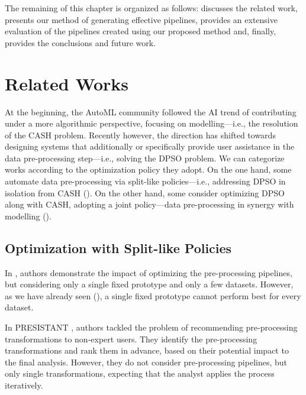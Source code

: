 The remaining of this chapter is organized as follows:
 discusses the related work,
 presents our method of generating effective pipelines,
 provides an extensive evaluation of the pipelines created using our proposed method and, finally,  provides the conclusions and future work.


\section{Related Works}
\label{effective-sec:related-work}
At the beginning, the AutoML community followed the AI trend of contributing under a more algorithmic perspective, focusing on modelling---i.e., the resolution of the CASH problem.
Recently however, the direction has shifted towards designing systems that additionally or specifically provide user assistance in the data pre-processing step---i.e., solving the DPSO problem.
We can categorize works according to the optimization policy \cite{quemy2019data} they adopt.
On the one hand, some automate data pre-processing via split-like policies---i.e., addressing DPSO in isolation from CASH ().
On the other hand, some consider optimizing DPSO along with CASH, adopting a joint policy---data pre-processing in synergy with modelling ().

\subsection{Optimization with Split-like Policies}
\label{effective-ssec:dpso}

In \cite{Quemy20InfSystems}, authors demonstrate the impact of optimizing the pre-processing pipelines, but considering only a single fixed prototype and only a few datasets.
However, as we have already seen (), a single fixed prototype cannot perform best for every dataset.

In PRESISTANT \cite{presistant18CSI,presistant18CAISE,presistant19DKE}, authors tackled the problem of recommending pre-processing transformations to non-expert users.
They identify the pre-processing transformations and rank them in advance, based on their potential impact to the final analysis.
However, they do not consider pre-processing pipelines, but only single transformations, expecting that the analyst applies the process iteratively.

